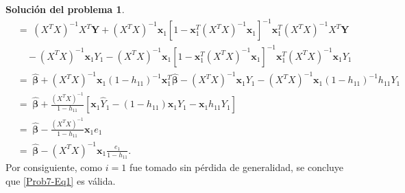 \documentclass[twoside,12pt]{article}
\theoremstyle{definition}
\newtheorem{soln}{Solución del problema}
\begin{document}
\begin{soln}
\[\begin{split}
&= \; (X^{T}X)^{-1}X^{T}\boldsymbol{Y}+(X^{T}X)^{-1}\boldsymbol{x}_1\left[1-\boldsymbol{x}_1^{T}(X^{T}X)^{-1}\boldsymbol{x}_1\right]^{-1}\boldsymbol{x}_1^{T}(X^{T}X)^{-1}X^{T}\boldsymbol{Y} \\
    & \quad -(X^{T}X)^{-1}\boldsymbol{x}_1Y_1 -(X^{T}X)^{-1}\boldsymbol{x}_1\left[1-\boldsymbol{x}_1^{T}(X^{T}X)^{-1}\boldsymbol{x}_1\right]^{-1}\boldsymbol{x}_1^{T}(X^{T}X)^{-1}\boldsymbol{x}_1Y_1 \\[10pt]
& = \; \hat{\boldsymbol{\beta}}+(X^{T}X)^{-1}\boldsymbol{x}_1(1-h_{11})^{-1}\boldsymbol{x}_1^{T}\hat{\boldsymbol{\beta}}
    -(X^{T}X)^{-1}\boldsymbol{x}_1Y_1 -(X^{T}X)^{-1}\boldsymbol{x}_1(1-h_{11})^{-1}h_{11}Y_1 \\[5pt]
& = \; \hat{\boldsymbol{\beta}}+\frac{(X^{T}X)^{-1}}{1-h_{11}} \left[
     \boldsymbol{x}_1\hat{Y}_1 - (1-h_{11})\boldsymbol{x}_1Y_1 - \boldsymbol{x}_1h_{11}Y_1\right]\\
& = \; \hat{\boldsymbol{\beta}}-\frac{(X^{T}X)^{-1}}{1-h_{11}} \boldsymbol{x}_1e_1 \\[5pt]
& = \; \hat{\boldsymbol{\beta}}-(X^{T}X)^{-1}\boldsymbol{x}_1 \frac{e_1}{1-h_{11}}.
\end{split}
\]
Por consiguiente, como $i=1$ fue tomado sin pérdida de generalidad, se concluye que \eqref{Prob7-Eq1} es válida.


\end{soln}
\end{document}
